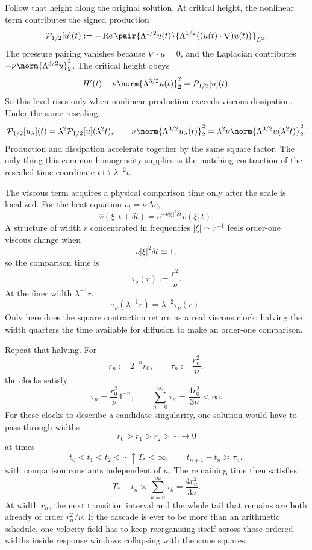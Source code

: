 
Follow that height along the original solution. At critical height, the nonlinear term contributes the signed production
\[
  \mathcal P_{1/2}[u](t)
  :=
  -\operatorname{Re}
  \pair
    {\Lambda^{1/2}u(t)}
    {\Lambda^{1/2}\bigl((u(t)\cdot\nabla)u(t)\bigr)}_{L^2}.
\]
The pressure pairing vanishes because \(\nabla\cdot u=0\), and the Laplacian contributes \(-\nu\norm{\Lambda^{3/2}u}_2^2\). The critical height obeys
\[
  H'(t)
  +
  \nu\norm{\Lambda^{3/2}u(t)}_2^2
  =
  \mathcal P_{1/2}[u](t).
\]
So this level rises only when nonlinear production exceeds viscous dissipation. Under the same rescaling,
\[
  \mathcal P_{1/2}[u_\lambda](t)
  =
  \lambda^2\mathcal P_{1/2}[u](\lambda^2t),
  \qquad
  \nu\norm{\Lambda^{3/2}u_\lambda(t)}_2^2
  =
  \lambda^2\nu\norm{\Lambda^{3/2}u(\lambda^2t)}_2^2.
\]
Production and dissipation accelerate together by the same square factor. The only thing this common homogeneity supplies is the matching contraction of the rescaled time coordinate \(t\mapsto\lambda^{-2}t\).


The viscous term acquires a physical comparison time only after the scale is localized. For the heat equation \(v_t=\nu\Delta v\),
\[
  \widehat v(\xi,t+\delta t)
  =
  e^{-\nu|\xi|^2\delta t}\widehat v(\xi,t).
\]
A structure of width \(r\) concentrated in frequencies \(|\xi|\simeq r^{-1}\) feels order-one viscous change when
\[
  \nu|\xi|^2\delta t\simeq1,
\]
so the comparison time is
\[
  \tau_\nu(r)
  :=
  \frac{r^2}{\nu}.
\]
At the finer width \(\lambda^{-1}r\),
\[
  \tau_\nu(\lambda^{-1}r)
  =
  \lambda^{-2}\tau_\nu(r).
\]
Only here does the square contraction return as a real viscous clock: halving the width quarters the time available for diffusion to make an order-one comparison.


Repeat that halving. For
\[
  r_n:=2^{-n}r_0,
  \qquad
  \tau_n:=\frac{r_n^2}{\nu},
\]
the clocks satisfy
\[
  \tau_n
  =
  \frac{r_0^2}{\nu}4^{-n},
  \qquad
  \sum_{n=0}^{\infty}\tau_n
  =
  \frac{4r_0^2}{3\nu}
  <
  \infty.
\]
For these clocks to describe a candidate singularity, one \NavierStokes{} solution would have to pass through widths
\[
  r_0>r_1>r_2>\cdots\longrightarrow0
\]
at times
\[
  t_0<t_1<t_2<\cdots\uparrow T_*<\infty,
  \qquad
  t_{n+1}-t_n\asymp\tau_n,
\]
with comparison constants independent of \(n\). The remaining time then satisfies
\[
  T_*-t_n
  \asymp
  \sum_{k=n}^{\infty}\tau_k
  =
  \frac{4r_n^2}{3\nu}.
\]
At width \(r_n\), the next transition interval and the whole tail that remains are both already of order \(r_n^2/\nu\). If the cascade is ever to be more than an arithmetic schedule, one velocity field has to keep reorganizing itself across those ordered widths inside response windows collapsing with the same squares.
